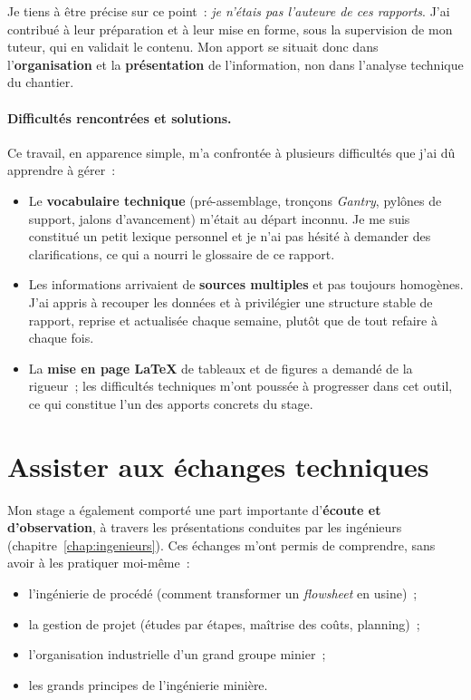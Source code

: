 \documentclass[12pt,a4paper,oneside]{report}
\begin{document}
Je tiens à être précise sur ce point~: \emph{je n'étais pas l'auteure de ces rapports}. J'ai contribué à leur préparation et à leur mise en forme, sous la supervision de mon tuteur, qui en validait le contenu. Mon apport se situait donc dans l'\textbf{organisation} et la \textbf{présentation} de l'information, non dans l'analyse technique du chantier.

\paragraph{Difficultés rencontrées et solutions.} Ce travail, en apparence simple, m'a confrontée à plusieurs difficultés que j'ai dû apprendre à gérer~:
\begin{itemize}
\item Le \textbf{vocabulaire technique} (pré-assemblage, tronçons \textit{Gantry}, pylônes de support, jalons d'avancement) m'était au départ inconnu. Je me suis constitué un petit lexique personnel et je n'ai pas hésité à demander des clarifications, ce qui a nourri le glossaire de ce rapport.
\item Les informations arrivaient de \textbf{sources multiples} et pas toujours homogènes. J'ai appris à recouper les données et à privilégier une structure stable de rapport, reprise et actualisée chaque semaine, plutôt que de tout refaire à chaque fois.
\item La \textbf{mise en page \LaTeX} de tableaux et de figures a demandé de la rigueur~; les difficultés techniques m'ont poussée à progresser dans cet outil, ce qui constitue l'un des apports concrets du stage.
\end{itemize}

\section{Assister aux échanges techniques}

Mon stage a également comporté une part importante d'\textbf{écoute et d'observation}, à travers les présentations conduites par les ingénieurs (chapitre~\ref{chap:ingenieurs}). Ces échanges m'ont permis de comprendre, sans avoir à les pratiquer moi-même~:

\begin{itemize}
\item l'ingénierie de procédé (comment transformer un \textit{flowsheet} en usine)~;
\item la gestion de projet (études par étapes, maîtrise des coûts, planning)~;
\item l'organisation industrielle d'un grand groupe minier~;
\item les grands principes de l'ingénierie minière.
\end{itemize}
\end{document}
